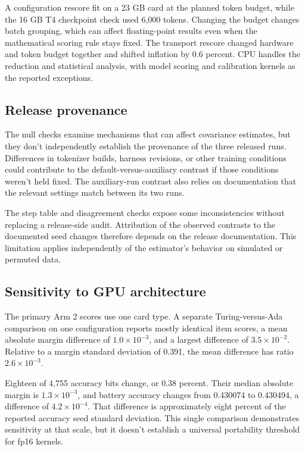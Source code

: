 A configuration rescore fit on a 23 GB card at the planned token budget, while the 16 GB T4 checkpoint check used 6,000 tokens. Changing the budget changes batch grouping, which can affect floating-point results even when the mathematical scoring rule stays fixed. The transport rescore changed hardware and token budget together and shifted inflation by 0.6 percent. CPU handles the reduction and statistical analysis, with model scoring and calibration kernels as the reported exceptions.

\subsection{Release provenance}
The null checks examine mechanisms that can affect covariance estimates, but they don't independently establish the provenance of the three released runs. Differences in tokenizer builds, harness revisions, or other training conditions could contribute to the default-versus-auxiliary contrast if those conditions weren't held fixed. The auxiliary-run contrast also relies on documentation that the relevant settings match between its two runs.

The step table and disagreement checks expose some inconsistencies without replacing a release-side audit. Attribution of the observed contrasts to the documented seed changes therefore depends on the release documentation. This limitation applies independently of the estimator's behavior on simulated or permuted data.

\subsection{Sensitivity to GPU architecture}
The primary Arm 2 scores use one card type. A separate Turing-versus-Ada comparison on one configuration reports mostly identical item scores, a mean absolute margin difference of $1.0\times10^{-3}$, and a largest difference of $3.5\times10^{-2}$. Relative to a margin standard deviation of 0.391, the mean difference has ratio $2.6\times10^{-3}$.

Eighteen of 4,755 accuracy bits change, or 0.38 percent. Their median absolute margin is $1.3\times10^{-3}$, and battery accuracy changes from 0.430074 to 0.430494, a difference of $4.2\times10^{-4}$. That difference is approximately eight percent of the reported accuracy seed standard deviation. This single comparison demonstrates sensitivity at that scale, but it doesn't establish a universal portability threshold for fp16 kernels.

